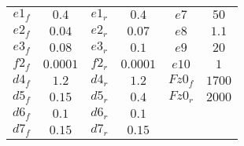 \begin{longtable}{cccccc}
$e1_f$ & $0.4    $   &  $e1_r$ & $0.4    $ &  $e7   $ & $50  $ \\    
$e2_f$ & $0.04   $   &  $e2_r$ & $0.07   $ &  $e8   $ & $1.1 $ \\    
$e3_f$ & $0.08   $   &  $e3_r$ & $0.1    $ &  $e9   $ & $20  $ \\    
$f2_f$ & $0.0001 $   &  $f2_r$ & $0.0001 $ &  $e10  $ & $1   $ \\    
$d4_f$ & $1.2    $   &  $d4_r$ & $1.2    $ &  $Fz0_f$ & $1700$ \\    
$d5_f$ & $0.15   $   &  $d5_r$ & $0.4    $ &  $Fz0_r$ & $2000$ \\    
$d6_f$ & $0.1    $   &  $d6_r$ & $0.1    $ &          &        \\ 
$d7_f$ & $0.15   $   &  $d7_r$ & $0.15   $ &          &        \\
\end{longtable}
%

%
